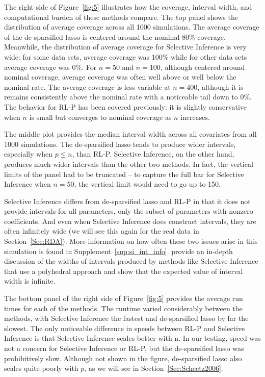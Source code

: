The right side of Figure~\ref{fig:5} illustrates how the coverage, interval width, and computational burden of these methods compare. The top panel shows the distribution of average coverage across all 1000 simulations. The average coverage of the de-sparsified lasso is centered around the nominal 80\% coverage. Meanwhile, the distribution of average coverage for Selective Inference is very wide: for some data sets, average coverage was 100\% while for other data sets average coverage was 0\%. For $n = 50$ and $n = 100$, although centered around nominal coverage, average coverage was often well above or well below the nominal rate. The average coverage is less variable at $n = 400$, although it is remains consistently above the nominal rate with a noticeable tail down to 0\%. The behavior for RL-P has been covered previously: it is slightly conservative when $n$ is small but converges to nominal coverage as $n$ increases.

The middle plot provides the median interval width across all covariates from all 1000 simulations. The de-sparsified lasso tends to produce wider intervals, especially when $p \le n$, than RL-P. Selective Inference, on the other hand, produces much wider intervals than the other two methods. In fact, the vertical limits of the panel had to be truncated -- to capture the full bar for Selective Inference when $n = 50$, the vertical limit would need to go up to 150.

Selective Inference differs from de-sparsified lasso and RL-P in that it does not provide intervals for all parameters, only the subset of parameters with nonzero coefficients. And even when Selective Inference does construct intervals, they are often infinitely wide (we will see this again for the real data in Section~\ref{Sec:RDA}). More information on how often these two issues arise in this simulation is found in Supplement~\ref{sup:si_int_info}. \citet{Kivaranovic2021} provide an in-depth discussion of the widths of intervals produced by methods like Selective Inference that use a polyhedral approach and show that the expected value of interval width is infinite.

The bottom panel of the right side of Figure~\ref{fig:5} provides the average run times for each of the methods. The runtime varied considerably between the methods, with Selective Inference the fastest and de-sparsified lasso by far the slowest.  The only noticeable difference in speeds between RL-P and Selective Inference is that Selective Inference scales better with n. In our testing, speed was not a concern for Selective Inference or RL-P, but the de-sparsified lasso was prohibitively slow. Although not shown in the figure, de-sparsified lasso also scales quite poorly with $p$, as we will see in Section~\ref{Sec:Scheetz2006}.

